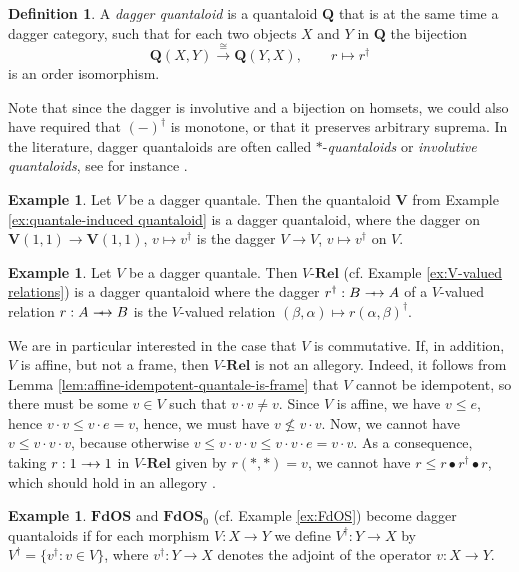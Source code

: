 \documentclass[12pt]{tac}
\theoremstyle{definition}
\newtheorem{definition}[theorem]{Definition}
\newtheorem{example}[theorem]{Example}
\theoremstyle{remark}
\newcommand{\<}{\langle}
\renewcommand{\>}{\rangle}
\renewcommand{\:}{\colon}
\def\sto{\relbar\joinrel\mapstochar\joinrel\rightarrow}
\begin{document}
\begin{definition}
     A \emph{dagger quantaloid} is a quantaloid $\mathbf Q$ that is at the same time a dagger category, such that for each two objects $X$ and $Y$ in $\mathbf Q$ the bijection
     \[ \mathbf Q(X,Y)\xrightarrow{\cong}\mathbf Q(Y,X),\qquad r\mapsto r^\dag\]is an order isomorphism.
\end{definition}
Note that since the dagger is involutive and a bijection on homsets, we could also have required that $(-)^\dag$ is monotone, or that it preserves arbitrary suprema.
In the literature, dagger quantaloids are often called $*$-\emph{quantaloids} or \emph{involutive quantaloids}, see for instance \cite{Heymans-Stubbe}.


\begin{example}\label{ex:commutative quantale induces dagger quantaloid}
Let $V$ be a dagger quantale. Then the quantaloid $\mathbf V$ from Example \ref{ex:quantale-induced quantaloid} is a dagger quantaloid, where the dagger on $\mathbf V(1,1)\to\mathbf V(1,1)$, $v\mapsto v^\dag$ is the dagger $V\to V$, $v\mapsto v^\dag$ on $V$.
\end{example}


\begin{example}\label{ex:V-Rel-dagger}
    Let $V$ be a dagger quantale. Then $V$-$\mathbf{Rel}$ (cf. Example \ref{ex:V-valued relations}) is a dagger quantaloid where the dagger $r^\dag:B\sto A$ of a $V$-valued relation $r:A\sto B$ is the $V$-valued relation $(\beta,\alpha)\mapsto r(\alpha,\beta)^\dag$. 
    
We are in particular interested in the case that $V$ is commutative. If, in addition, $V$ is affine, but not a frame, then $V$-$\mathbf{Rel}$ is not an allegory. Indeed, it follows from Lemma \ref{lem:affine-idempotent-quantale-is-frame} that $V$ cannot be idempotent, so there must be some $v\in V$ such that $v\cdot v\neq v$. Since $V$ is affine, we have $v\leq e$, hence $v\cdot v\leq v\cdot e=v$, hence, we must have $v\nleq v\cdot v$. Now, we cannot have $v\leq v\cdot v\cdot v$, because otherwise $v\leq v\cdot v\cdot v\leq v\cdot v\cdot e=v\cdot v$. As a consequence, taking $r:1\sto 1$ in $V$-$\mathbf{Rel}$ given by $r(*,*)=v$, we cannot have $r\leq r\bullet r^\dag\bullet r$, which should hold in an allegory \cite[ Lemma A.3.2.1]{johnstone:elephant1}.
\end{example}

\begin{example}\label{ex:FdOS-dagger}
    $\mathbf{FdOS}$ and $\mathbf{FdOS}_0$ (cf. Example \ref{ex:FdOS}) become dagger quantaloids if for each morphism $V:X\to Y$ we define $V^\dag:Y\to X$ by $V^\dag=\{v^\dag:v\in V\}$, where $v^\dag:Y\to X$ denotes the adjoint of the operator $v:X\to Y$. 
\end{example}
\end{document}
